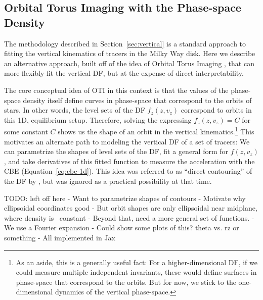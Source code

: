 \subsection{Orbital Torus Imaging with the Phase-space Density} \label{sec:oti-psd}


The methodology described in Section~\ref{sec:vertical} is a standard approach to
fitting the vertical kinematics of tracers in the Milky Way disk.
Here we describe an alternative approach, built off of the idea of Orbital Torus Imaging
\citep[OTI][]{Price-Whelan:2021}, that can more flexibly fit the vertical DF, but at the
expense of direct interpretability.

The core conceptual idea of OTI in this context is that the values of the phase-space
density itself define curves in phase-space that correspond to the orbits of stars.
In other words, the level sets of the DF $f_z(z, v_z)$ correspond to orbits in this 1D,
equilibrium setup.
Therefore, solving the expressing $f_z(z, v_z) = C$ for some constant $C$ shows us the
shape of an orbit in the vertical kinematics.\footnote{As an aside, this is a generally
useful fact: For a higher-dimensional DF, if we could measure multiple independent
invariants, these would define surfaces in phase-space that correspond to the orbits.
But for now, we stick to the one-dimensional dynamics of the vertical phase-space.}
This motivates an alternate path to modeling the vertical DF of a set of tracers: We can
parametrize the shapes of level sets of the DF, fit a general form for $f(z, v_z)$, and
take derivatives of this fitted function to measure the acceleration with the CBE
(Equation~\ref{eq:cbe-1d}).
This idea was referred to as ``direct contouring'' of the DF by \citet{Kuijken:XXXX},
but was ignored as a practical possibility at that time.

TODO: left off here
- Want to parametrize shapes of contours
- Motivate why ellipsoidal coordinates good
- But orbit shapes are only ellipsoidal near midplane, where density is ~constant
- Beyond that, need a more general set of functions.
- We use a Fourier expansion
- Could show some plots of this? theta vs. rz or something
- All implemented in Jax


